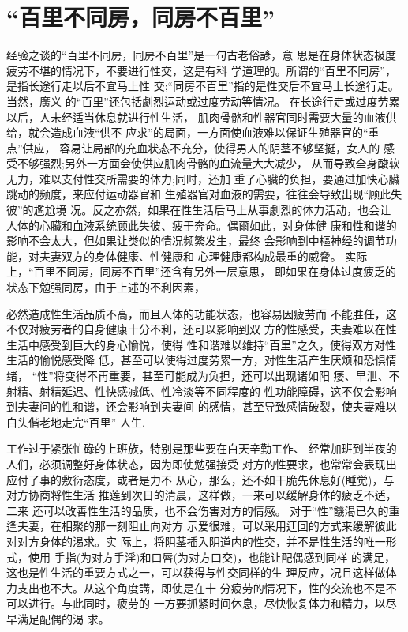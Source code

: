 \documentclass[12pt,UTF8]{ctexbook}
\begin{document}
\section{“百里不同房，同房不百里”}

经验之谈的“百里不同房，同房不百里”是一句古老俗諺，意
思是在身体状态极度疲劳不堪的情况下，不要进行性交，这是有科
学道理的。所谓的“百里不同房”，是指长途行走以后不宜马上性
交;“同房不百里”指的是性交后不宜马上长途行走。当然，廣义
的“百里”还包括劇烈运动或过度劳动等情况。
在长途行走或过度劳累以后，人未经适当休息就进行性生活，
肌肉骨骼和性器官同时需要大量的血液供给，就会造成血液“供不
应求”的局面，一方面使血液难以保证生殖器官的“重点”供应，
容易让局部的充血状态不充分，使得男人的阴茎不够坚挺，女人的
感受不够强烈;另外一方面会使供应肌肉骨骼的血流量大大减少，
从而导致全身酸软无力，难以支付性交所需要的体力;同时，还加
重了心臟的负担，要通过加快心臟跳动的频度，来应付运动器官和
生殖器官对血液的需要，往往会导致出现“顾此失彼”的尷尬境
况。反之亦然，如果在性生活后马上从事劇烈的体力活动，也会让
人体的心臟和血液系统顾此失彼、疲于奔命。偶爾如此，对身体健
康和性和谐的影响不会太大，但如果让类似的情况频繁发生，最终
会影响到中樞神经的调节功能，对夫妻双方的身体健康、性健康和
心理健康都构成最重的威脅。
实际上，“百里不同房，同房不百里”还含有另外一层意思，
即如果在身体过度疲乏的状态下勉强同房，由于上述的不利因素，

必然造成性生活品质不高，而且人体的功能状态，也容易因疲劳而
不能胜任，这不仅对疲劳者的自身健康十分不利，还可以影响到双
方的性感受，夫妻难以在性生活中感受到巨大的身心愉悦，使得
性和谐难以维持“百里”之久，使得双方对性生活的愉悦感受降
低，甚至可以使得过度劳累一方，对性生活产生厌烦和恐惧情绪，
“性”将变得不再重要，甚至可能成为负担，还可以出现诸如阳
痿、早泄、不射精、射精延迟、性快感减低、性冷淡等不同程度的
性功能障碍，这不仅会影响到夫妻问的性和谐，还会影响到夫妻间
的感情，甚至导致感情破裂，使夫妻难以白头偕老地走完“百里”
人生.

工作过于紧张忙碌的上班族，特别是那些要在白天辛勤工作、
经常加班到半夜的人们，必须调整好身体状态，因为即使勉强接受
对方的性要求，也常常会表现出应付了事的敷衍态度，或者是力不
从心，那么，还不如干脆先休息好(睡觉)，与对方协商将性生活
推莲到次日的清晨，这样做，一来可以缓解身体的疲乏不适，二来
还可以改善性生活的品质，也不会伤害对方的情感。
对于“性”饑渴已久的重逢夫妻，在相聚的那一刻阻止向对方
示爱很难，可以采用迂回的方式来缓解彼此对对方身体的渴求。实
际上，将阴茎插入阴道内的性交，并不是性生活的唯一形式，使用
手指(为对方手淫)和口唇(为对方口交)，也能让配偶感到同样
的满足，这也是性生活的重要方式之一，可以获得与性交同样的生
理反应，况且这样做体力支出也不大。从这个角度講，即使是在十
分疲劳的情况下，性的交流也不是不可以进行。与此同时，疲劳的
一方要抓紧时间休息，尽快恢复体力和精力，以尽早满足配偶的渴
求。
\end{document}
